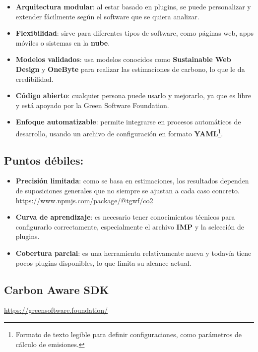 \documentclass[12pt,a4paper]{report}
\begin{document}
\begin{itemize}
  \item \textbf{Arquitectura modular}: al estar basado en plugins, se puede personalizar y extender fácilmente según el software que se quiera analizar.
  \item \textbf{Flexibilidad}: sirve para diferentes tipos de software, como páginas web, apps móviles o sistemas en la \textbf{nube}.
  \item \textbf{Modelos validados}: usa modelos conocidos como \textbf{Sustainable Web Design} y \textbf{OneByte} para realizar las estimaciones de carbono, lo que le da credibilidad.
  \item \textbf{Código abierto}: cualquier persona puede usarlo y mejorarlo, ya que es libre y está apoyado por la Green Software Foundation.
  \item \textbf{Enfoque automatizable}: permite integrarse en procesos automáticos de desarrollo, usando un archivo de configuración en formato \textbf{YAML}\footnote{Formato de texto legible para definir configuraciones, como parámetros de cálculo de emisiones.}.
\end{itemize}

\subsection*{Puntos débiles:}

\begin{itemize}
  \item \textbf{Precisión limitada}: como se basa en estimaciones, los resultados dependen de suposiciones generales que no siempre se ajustan a cada caso concreto. \href{https://www.npmjs.com/package/@tgwf/co2}{https://www.npmjs.com/package/@tgwf/co2}
  \item \textbf{Curva de aprendizaje}: es necesario tener conocimientos técnicos para configurarlo correctamente, especialmente el archivo \textbf{IMP} y la selección de plugins.
  \item \textbf{Cobertura parcial}: es una herramienta relativamente nueva y todavía tiene pocos plugins disponibles, lo que limita su alcance actual.
\end{itemize}

\subsection*{Carbon Aware SDK}

\href{https://greensoftware.foundation/}{https://greensoftware.foundation/}
\end{document}
